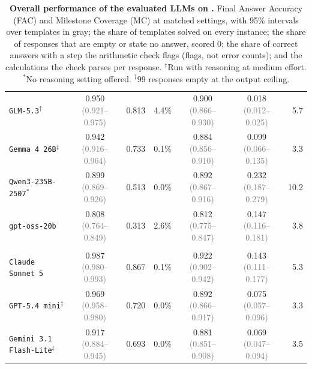 \begin{table}[t]
{\begin{tabular}{l c c r c c r}
\texttt{GLM-5.3}$^{\dagger}$ & 0.950 {\scriptsize\textcolor{gray}{(0.921--0.975)}} & 0.813 & 4.4\% & 0.900 {\scriptsize\textcolor{gray}{(0.866--0.930)}} & 0.018 {\scriptsize\textcolor{gray}{(0.012--0.025)}} & 5.7 \\
\texttt{Gemma 4 26B}$^{\ddagger}$ & 0.942 {\scriptsize\textcolor{gray}{(0.916--0.964)}} & 0.733 & 0.1\% & 0.884 {\scriptsize\textcolor{gray}{(0.856--0.910)}} & 0.099 {\scriptsize\textcolor{gray}{(0.066--0.135)}} & 3.3 \\
\texttt{Qwen3-235B-2507}$^{\ast}$ & 0.899 {\scriptsize\textcolor{gray}{(0.869--0.926)}} & 0.513 & 0.0\% & 0.892 {\scriptsize\textcolor{gray}{(0.867--0.916)}} & 0.232 {\scriptsize\textcolor{gray}{(0.187--0.279)}} & 10.2 \\
\texttt{gpt-oss-20b} & 0.808 {\scriptsize\textcolor{gray}{(0.764--0.849)}} & 0.313 & 2.6\% & 0.812 {\scriptsize\textcolor{gray}{(0.775--0.847)}} & 0.147 {\scriptsize\textcolor{gray}{(0.116--0.181)}} & 3.8 \\
\rowcolor{gray!10}\multicolumn{7}{l}{\textit{Closed LLMs}} \\
\texttt{Claude Sonnet 5} & 0.987 {\scriptsize\textcolor{gray}{(0.980--0.993)}} & 0.867 & 0.1\% & 0.922 {\scriptsize\textcolor{gray}{(0.902--0.942)}} & 0.143 {\scriptsize\textcolor{gray}{(0.111--0.177)}} & 5.3 \\
\texttt{GPT-5.4 mini}$^{\ddagger}$ & 0.969 {\scriptsize\textcolor{gray}{(0.958--0.980)}} & 0.720 & 0.0\% & 0.892 {\scriptsize\textcolor{gray}{(0.866--0.917)}} & 0.075 {\scriptsize\textcolor{gray}{(0.057--0.096)}} & 3.3 \\
\texttt{Gemini 3.1 Flash-Lite}$^{\ddagger}$ & 0.917 {\scriptsize\textcolor{gray}{(0.884--0.945)}} & 0.693 & 0.0\% & 0.881 {\scriptsize\textcolor{gray}{(0.851--0.908)}} & 0.069 {\scriptsize\textcolor{gray}{(0.047--0.094)}} & 3.5 \\
\bottomrule
\end{tabular}
}
\caption{\textbf{Overall performance of the evaluated LLMs on \ourdataset.} Final Answer Accuracy
(FAC) and Milestone Coverage (MC) at matched settings, with 95\% intervals over templates in gray;
the share of templates solved on every instance; the share of responses that are empty or state no
answer, scored 0; the share of correct answers with a step the arithmetic check flags (flags, not
error counts); and the calculations the check parses per response. $^{\ddagger}$Run with reasoning
at medium effort. $^{\ast}$No reasoning setting offered. $^{\dagger}$99 responses empty at the
output ceiling.}
\label{tab:main_results}
\end{table}


